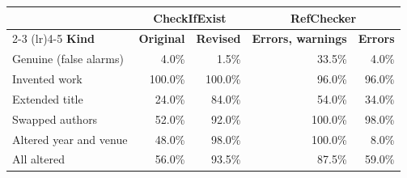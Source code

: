\begin{tabular}{lrrrr}
\toprule
 & \multicolumn{2}{c}{\textbf{CheckIfExist}} & \multicolumn{2}{c}{\textbf{RefChecker}} \\
\cmidrule(lr){2-3} \cmidrule(lr){4-5}
\textbf{Kind} & \textbf{Original} & \textbf{Revised} & \textbf{Errors, warnings} & \textbf{Errors} \\
\midrule
Genuine (false alarms) & 4.0\% & 1.5\% & 33.5\% & 4.0\% \\
\midrule
Invented work & 100.0\% & 100.0\% & 96.0\% & 96.0\% \\
Extended title & 24.0\% & 84.0\% & 54.0\% & 34.0\% \\
Swapped authors & 52.0\% & 92.0\% & 100.0\% & 98.0\% \\
Altered year and venue & 48.0\% & 98.0\% & 100.0\% & 8.0\% \\
\midrule
All altered & 56.0\% & 93.5\% & 87.5\% & 59.0\% \\
\bottomrule
\end{tabular}
